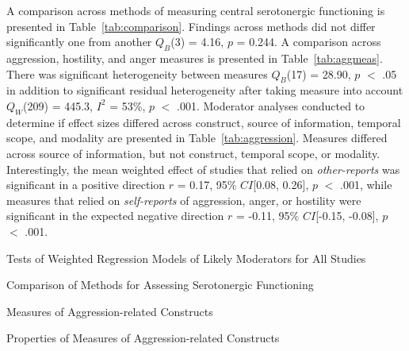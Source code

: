 \documentclass[man]{apa6}\usepackage{graphicx, color}
\begin{document}
A comparison across methods of measuring central serotonergic functioning is presented in Table~\ref{tab:comparison}. Findings across methods did not differ significantly one from another $Q_B$(3) = 4.16, 
$p$ = 0.244. A comparison across aggression, hostility, and anger measures is presented in Table~\ref{tab:aggmeas}. There was significant heterogeneity between measures $Q_B$(17) = 28.90, 
$p$ $<$ .05 in addition to significant residual heterogeneity after taking measure into account $Q_W$(209) = 445.3, $I^2$ = 53\%, $p$ $<$ .001. Moderator analyses conducted to determine if effect sizes differed across construct, source of information, temporal scope, and modality are presented in Table~\ref{tab:aggression}. Measures differed across source of information, but not construct, temporal scope, or modality. Interestingly, the mean weighted effect of studies that relied on \emph{other-reports} was significant in a positive direction $r$ = 0.17, 95\% $CI$[0.08, 0.26], $p$ $<$ .001, while measures that relied on \emph{self-reports} of aggression, anger, or hostility were significant in the expected negative direction $r$ = -0.11, 95\% $CI$[-0.15, -0.08], $p$ $<$ .001.


\begin{table*}[h]
  \caption{Tests of Weighted Regression Models of Likely Moderators for All Studies}
  \label{tab:overall_m1}  
  \footnotesize{}
  \vspace*{.95in}
\end{table*}


\begin{table*}[h]
 \centering
 \caption{Comparison of Methods for Assessing Serotonergic Functioning}
 \label{tab:comparison}
 \footnotesize{}
 \vspace*{.6in} 
\end{table*}


\begin{table*}[h] 
 \centering
 \caption{Measures of Aggression-related Constructs}
 \label{tab:aggmeas}
 \footnotesize{}
 \vspace*{.6in} 
\end{table*}


\begin{table*}[h] 
 \centering
 \caption{Properties of Measures of Aggression-related Constructs}
 \label{tab:aggression}
 \footnotesize{}
 \vspace*{.6in} 
\end{table*}
\end{document}
